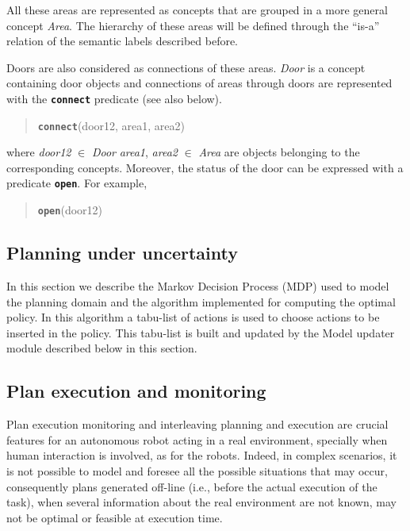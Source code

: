All these areas are represented as concepts that are grouped in a more general concept \emph{Area}. The hierarchy of these areas will be defined through the ``is-a'' relation of the semantic labels described before.

Doors are also considered as connections of these areas. \emph{Door} is a concept containing door objects and connections of areas through doors are represented with the {\tt\bf connect} predicate (see also below).

\begin{quote}
{\tt\bf connect}(door12, area1, area2)
\end{quote}

\noindent
where \emph{door12} $\in$ \emph{Door} \emph{area1}, \emph{area2} $\in$ \emph{Area}  are objects belonging to the corresponding concepts. Moreover, the status of the door can be expressed with a predicate {\tt\bf open}. For example,

\begin{quote}
{\tt\bf open}(door12) \\
\end{quote}





\subsection{Planning under uncertainty}

In this section we describe the Markov Decision Process (MDP) used to model the \coaches planning domain and the algorithm implemented for computing the optimal policy.
In this algorithm a tabu-list of actions is used to choose actions to be inserted in the policy.
This tabu-list is built and updated by the Model updater module described below in this section.







\subsection{Plan execution and monitoring}


Plan execution monitoring and interleaving planning and execution are crucial features for an autonomous robot acting in a real environment, specially when human interaction is involved, 
as for the \coaches robots. Indeed, in complex scenarios, it is not possible to model and foresee all the possible situations that may occur, consequently plans generated off-line (i.e., before the actual execution of the task), when several information about the real environment are not known, may not be optimal or feasible at execution time.

